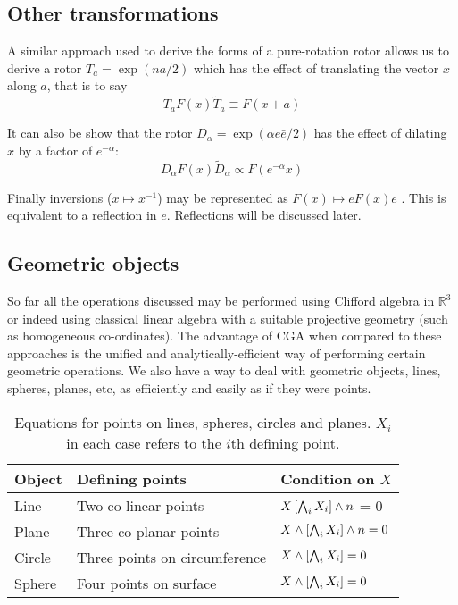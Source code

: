 \subsection{Other transformations}

A similar approach used to derive the forms of a pure-rotation
rotor allows us to derive a
rotor $T_a = \exp (na/2)$ which has the effect of translating the vector
$x$ along $a$, that is to say
\begin{displaymath}
T_a F(x) \tilde{T}_a \equiv F(x + a)
\end{displaymath}

It can also be show that the rotor $D_\alpha = \exp (\alpha e \bar{e} / 2)$ has
the effect of dilating $x$ by a factor of $e^{-\alpha}$:
\begin{displaymath}
D_\alpha F(x) \tilde{D}_\alpha \propto F(e^{-\alpha} x)
\end{displaymath}

Finally inversions ($x \mapsto x^{-1}$) may be represented as 
$F(x) \mapsto eF(x)e$ 
\cite{wareham_lasenby}. This is equivalent to a reflection in $e$. Reflections
will be discussed later.

\subsection{Geometric objects}

So far all the operations discussed may be performed using Clifford algebra in
$\mathbb{R}^3$ or indeed using classical linear algebra with a suitable
projective geometry (such as homogeneous co-ordinates). The advantage of CGA
when compared to these approaches is the unified and analytically-efficient way
of performing certain geometric operations. We also have a way to deal with
geometric objects, lines, spheres, planes, etc, as efficiently and easily
as if they were points.

\begin{table}
\centering
\begin{tabular}{lll}
Object & Defining points & Condition on $X$ \\
\hline
Line & Two co-linear points & $X \left[\bigwedge_i X_i\right] \wedge n$ = 0\\
Plane & Three co-planar points &
$X \wedge \left[\bigwedge_i X_i\right] \wedge n =0 $ \\
Circle & Three points on circumference &
$X \wedge \left[\bigwedge_i X_i\right] = 0$ \\
Sphere & Four points on surface &
$X \wedge \left[\bigwedge_i X_i\right] = 0$ \\
\end{tabular}
\caption{Equations for points on lines, spheres, circles and planes. $X_i$ in each
case refers to the $i$th defining point.\label{tab:objects}}
\end{table}

